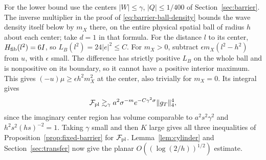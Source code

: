 For the lower bound use the centers $|W|\le\gamma$, $|Q|\le1/400$ of
Section~\ref{sec:barrier}. The inverse multiplier in the proof of
\eqref{eq:barrier-ball-density} bounds the wave density itself below
by $m_X$ there, on the entire physical spatial ball of radius $h$ about
each center; take $d=1$ in that formula. For the distance $l$ to its
center, $H_{\rm fib}(l^2)=6I$, so $L_B(l^2)=24|e|^2\le C$. For $m_X>0$, subtract $\epsilon m_X(l^2-h^2)$ from $u$, with
$\epsilon$ small. The difference has strictly positive $L_B$ on the
whole ball and is nonpositive on its boundary, so it cannot have a
positive interior maximum. This gives $(-u)\mu\ge\epsilon h^2m_X^2$
at the center, also trivially for $m_X=0$. Its integral gives
\[
 \mathcal F_{\rm pl}\gtrsim_\gamma
     a^2\sigma^{-m} e^{-C\gamma^2\sigma}\|g_T\|_4^4,
\]
since the imaginary center region has volume comparable to
$a^2s^2\gamma^2$ and $h^2s^2(hs)^{-2}=1$. Taking $\gamma$ small and
then $K$ large gives all three inequalities of
Proposition~\ref{prop:fixed-barrier} for $\mathcal F_{\rm pl}$.
Lemma~\ref{lem:cylinder} and Section~\ref{sec:transfer} now give the
planar $O((\log(2/h))^{1/2})$ estimate.
